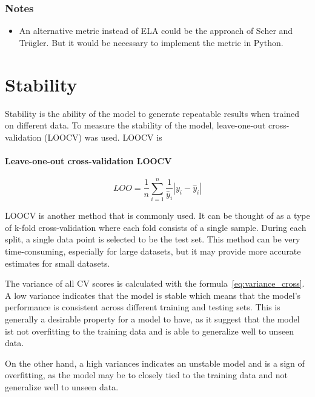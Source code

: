 \subsubsection*{Notes}

\begin{itemize}
    \item An alternative metric instead of ELA could be the approach of Scher and Trügler. But it would be necessary to implement the metric in Python.
\end{itemize}


\section{Stability}
Stability is the ability of the model to generate repeatable results when trained on different data. \cite[p. 16]{siebert_constructionqualitymodel_}
To measure the stability of the model, leave-one-out cross-validation (\ac{LOOCV}) was used.
\ac{LOOCV} is


\paragraph*{Leave-one-out cross-validation \ac{LOOCV}}

\begin{equation}
    \label{eq:loo}
    LOO = \frac{1}{n} \sum_{i=1}^{n} \frac{1}{\hat{y}_i} |y_i - \hat{y}_i|
\end{equation}

\ac{LOOCV} is another method that is commonly used. It can be thought of as a type of k-fold cross-validation where each fold consists of a single sample. During each split, a single data point is selected to be the test set. This method can be very time-consuming, especially for large datasets, but it may provide more accurate estimates for small datasets. \cite[p. 257-258]{muller_introductionmachinelearning_2016}

The variance of all \ac{CV} scores is calculated with the formula~\ref{eq:variance_cross}.
A low variance indicates that the model is stable which means that the model's performance is consistent across different training and testing sets. This is generally  a desirable property for a model to have, as it suggest that the model ist not overfitting to the training data and is able to generalize well to unseen data.

On the other hand, a high variances indicates an unstable model and is a sign of overfitting, as the model may be to closely tied to the training data and not generalize well to unseen data.

